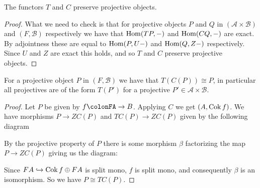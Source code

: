 \begin{cor}
	The functors $T$ and $C$ preserve projective objects.
	\begin{proof}
		What we need to check is that for projective objects $P$ and $Q$ in $(\mathcal A \times \mathcal B)$ and $(F, \mathcal B)$ respectively we have that $\operatorname{Hom}(TP, -)$ and $\operatorname{Hom}(CQ, -)$ are exact. By adjointness these are equal to $\operatorname{Hom}(P, U-)$ and $\operatorname{Hom}(Q, Z-)$ respectively. Since $U$ and $Z$ are exact this holds, and so $T$ and $C$ preserve projective objects.
	\end{proof}
\end{cor}

\begin{prop}\cite[Corollary~1.6c]{FGR75}
	For a projective object $P$ in $(F, \mathcal B)$ we have that $T(C(P)) \cong P$, in particular all projectives are of the form $T(P')$ for a projective $P' \in \mathcal A \times \mathcal B$.
	\begin{proof}
		Let $P$ be given by $f\colonFA \to B$. Applying $C$ we get $(A, \operatorname{Cok} f)$. We have morphisms $P \to ZC(P)$ and $TC(P) \to ZC(P)$ given by the following diagram
		\begin{center}
		\end{center}
		By the projective property of $P$ there is some morphism $\beta$ factorizing the map $P \to ZC(P)$ giving us the diagram:
		\begin{center}
		\end{center}
		Since $FA \hookrightarrow \operatorname{Cok} f \oplus FA$ is split mono, $f$ is split mono, and consequently $\beta$ is an isomorphism. So we have $P \cong TC(P)$.
	\end{proof}
\end{prop}

